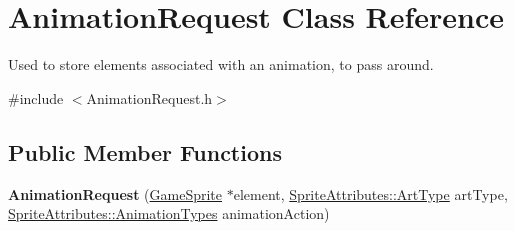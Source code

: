 \hypertarget{class_animation_request}{}\section{Animation\+Request Class Reference}
\label{class_animation_request}


Used to store elements associated with an animation, to pass around.  




{\ttfamily \#include $<$Animation\+Request.\+h$>$}

\subsection*{Public Member Functions}
\begin{DoxyCompactItemize}
\item 
\mbox{\label{class_animation_request_ab3dbecb7ca37d7b13f68990ffbd6b581}} 
{\bfseries Animation\+Request} (\mbox{\hyperlink{class_game_sprite}{Game\+Sprite}} $\ast$element, \mbox{\hyperlink{namespace_sprite_attributes_afb5447c311bc29f0ce8ddfd025c6e998}{Sprite\+Attributes\+::\+Art\+Type}} art\+Type, \mbox{\hyperlink{namespace_sprite_attributes_ae1a753cb32f500b34381aac4b197b3a7}{Sprite\+Attributes\+::\+Animation\+Types}} animation\+Action)
\end{DoxyCompactItemize}

